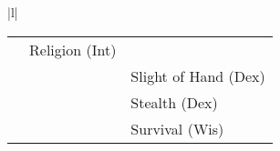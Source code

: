 \begin{tabular}{|l|}
\begin{tabular}{l r l}
{\scriptsize \ifthenelse{\DndReligionMod<0}{}{+}\DndReligionMod} &
{\scriptsize Religion} {\tiny(Int)} \\
%
{\scriptsize \dndProfCircle{\DndIsProficientSlightOfHand}} &
{\scriptsize \ifthenelse{\DndSlightOfHandMod<0}{}{+}\DndSlightOfHandMod} &
{\scriptsize Slight of Hand} {\tiny(Dex)} \\
%
{\scriptsize \dndProfCircle{\DndIsProficientStealth}} &
{\scriptsize \ifthenelse{\DndStealthMod<0}{}{+}\DndStealthMod} &
{\scriptsize Stealth} {\tiny(Dex)} \\
%
{\scriptsize \dndProfCircle{\DndIsProficientSurvival}} &
{\scriptsize \ifthenelse{\DndSurvivalMod<0}{}{+}\DndSurvivalMod} &
{\scriptsize Survival} {\tiny(Wis)} \\
\end{tabular} \\
\hline
\end{tabular}
